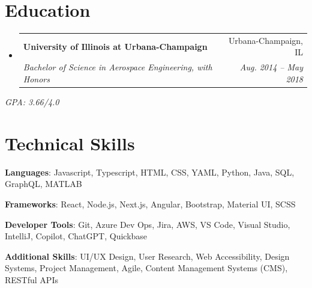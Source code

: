 \documentclass[letterpaper,11pt]{article}
\makeatletter
\newcommand{\resumeSubheading}[4]{
  \vspace{-2pt}\item
    \begin{tabular*}{0.97\textwidth}[t]{l@{\extracolsep{\fill}}r}
      \textbf{#1} & #2 \\
      \textit{\small#3} & \textit{\small #4} \\
    \end{tabular*}\vspace{-7pt}
}
\newcommand{\resumeSubHeadingListStart}{\begin{itemize}[leftmargin=0.15in, label={}]}
\newcommand{\resumeSubHeadingListEnd}{\end{itemize}}
\makeatother
\begin{document}
\section{Education}
  \resumeSubHeadingListStart
    \resumeSubheading
      {University of Illinois at Urbana-Champaign}{Urbana-Champaign, IL}
      {Bachelor of Science in Aerospace Engineering, with Honors }{Aug. 2014 -- May 2018}

  \resumeSubHeadingListEnd
  \vspace{-3pt}
  \hspace{7pt}
  \textit{\small GPA: 3.66/4.0} 


%
\section{Technical Skills}

 \begin{itemize}[leftmargin=1.41in, label={}]
    \setlength{\itemindent}{-1.26in}
    \setlength\itemsep{-0.3em}
    \small{\item{
     \textbf{Languages}{: Javascript, Typescript, HTML, CSS, YAML, Python, Java, SQL, GraphQL, MATLAB}
     }
     \item{
     \textbf{Frameworks}{: React, Node.js, Next.js, Angular, Bootstrap, Material UI, SCSS }
     }
     \item{
     \textbf{Developer Tools}{: Git, Azure Dev Ops, Jira, AWS, VS Code, Visual Studio, IntelliJ, Copilot, ChatGPT, Quickbase}
     }
     \item{
      \textbf{Additional Skills}{: UI/UX Design, User Research, Web Accessibility, Design Systems, Project Management, Agile, 
      Content Management Systems (CMS), RESTful APIs}
      }
    }


 \end{itemize}

\end{document}
